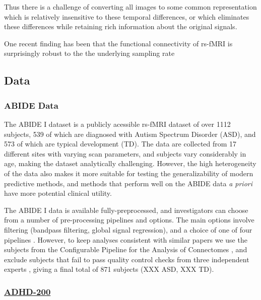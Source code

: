 \documentclass[10pt]{article}
\begin{document}
Thus there is a challenge of converting all images to some common representation which is relatively
insensitive to these temporal differences, or which eliminates these differences while retaining
rich information about the original signals.

One recent finding has been that the functional connectivity of rs-fMRI is surprisingly robust to the
the underlying sampling rate \citep{huotariSamplingRateEffects2019,shakilEvaluationSlidingWindow2016}

\subsection{Data}

\subsubsection{ABIDE Data}

The ABIDE I dataset \citep{dimartinoAutismBrainImaging2014} is a publicly acessible rs-fMRI dataset of over
1112 subjects, 539 of which are diagnosed with Autism Spectrum Disorder (ASD),
and 573 of which are typical development (TD). The data are collected from 17 different sites with
varying scan parameters, and subjects vary considerably in age, making the dataset analytically
challenging. However, the high heterogeneity of the data also makes it more suitable for testing the
generalizability of modern predictive methods, and methods that perform well on the ABIDE data
\emph{a priori} have more potential clinical utility.

The ABIDE I data is available fully-preprocessed, and investigators can choose from a number of
pre-processing pipelines and options. The main options involve filtering (bandpass filtering, global
signal regression), and a choice of one of four pipelines \citep{dimartinoAutismBrainImaging2014}.
However, to keep analyses consistent with similar papers
\citet{abrahamDerivingReproducibleBiomarkers2017, mostafaDiagnosisAutismSpectrum2019,
yinDiagnosisAutismSpectrum2021, heinsfeldIdentificationAutismSpectrum2018} we use the subjects from
the Configurable Pipeline for the Analysis of Connectomes
\citep[CPAC;][]{cameronAutomatedAnalysisConnectomes2013}, and exclude subjects that fail to pass quality
control checks from three independent experts \citep[see][for
details]{abrahamDerivingReproducibleBiomarkers2017}, giving a final total of 871 subjects (XXX ASD,
XXX TD).

\subsubsection{\href{http://preprocessed-connectomes-project.org/adhd200/}{ADHD-200}}
\end{document}
